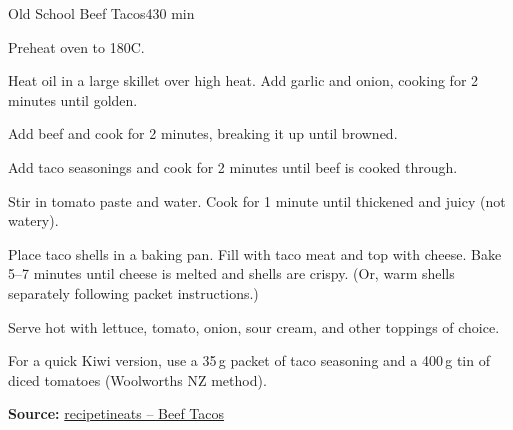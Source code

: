 \begin{recipebox}{Old School Beef Tacos}{4}{30 min}
\begin{method}
  \item Preheat oven to 180\degree C.
  \item Heat oil in a large skillet over high heat. Add garlic and onion, cooking for 2 minutes until golden.
  \item Add beef and cook for 2 minutes, breaking it up until browned.
  \item Add taco seasonings and cook for 2 minutes until beef is cooked through.
  \item Stir in tomato paste and water. Cook for 1 minute until thickened and juicy (not watery).
  \item Place taco shells in a baking pan. Fill with taco meat and top with cheese. Bake 5–7 minutes until cheese is melted and shells are crispy. (Or, warm shells separately following packet instructions.)
  \item Serve hot with lettuce, tomato, onion, sour cream, and other toppings of choice.
\end{method}

\begin{notes}
For a quick Kiwi version, use a 35\,g packet of taco seasoning and a 400\,g tin of diced tomatoes (Woolworths NZ method).
\end{notes}

\textbf{Source:} \href{https://www.recipetineats.com/ground-beef-tacos-recipe/}{recipetineats – Beef Tacos}
\end{recipebox}
